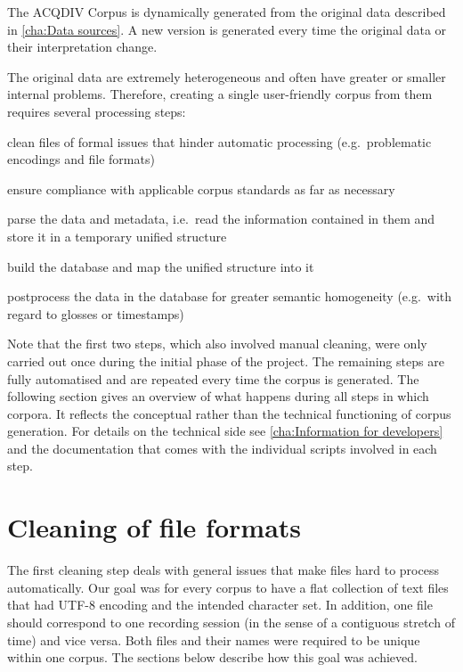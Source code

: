 \documentclass[a4paper, 11pt]{book}
\begin{document}
The ACQDIV Corpus is dynamically generated from the original data described in \autoref{cha:Data sources}. A new version is generated every time the original data or their interpretation change. 

The original data are extremely heterogeneous and often have greater or smaller internal problems. Therefore, creating a single user-friendly corpus from them requires several processing steps: 

\begin{itemize*}
	\item clean files of formal issues that hinder automatic processing (e.g.\ problematic encodings and file formats)
	\item ensure compliance with applicable corpus standards as far as necessary
	\item parse the data and metadata, i.e.\ read the information contained in them and store it in a temporary unified structure
	\item build the database and map the unified structure into it
	\item postprocess the data in the database for greater semantic homogeneity (e.g.\ with regard to glosses or timestamps)
\end{itemize*}

Note that the first two steps, which also involved manual cleaning, were only carried out once during the initial phase of the project. The remaining steps are fully automatised and are repeated every time the corpus is generated. The following section gives an overview of what happens during all steps in which corpora. It reflects the conceptual rather than the technical functioning of corpus generation. For details on the technical side see \autoref{cha:Information for developers} and the documentation that comes with the individual scripts involved in each step.


\section{Cleaning of file formats}
\label{sec:Cleaning of file formats}

The first cleaning step deals with general issues that make files hard to process automatically. Our goal was for every corpus to have a flat collection of text files that had UTF-8 encoding and the intended character set. In addition, one file should correspond to one recording session (in the sense of a contiguous stretch of time) and vice versa. Both files and their names were required to be unique within one corpus. The sections below describe how this goal was achieved. 
\end{document}
